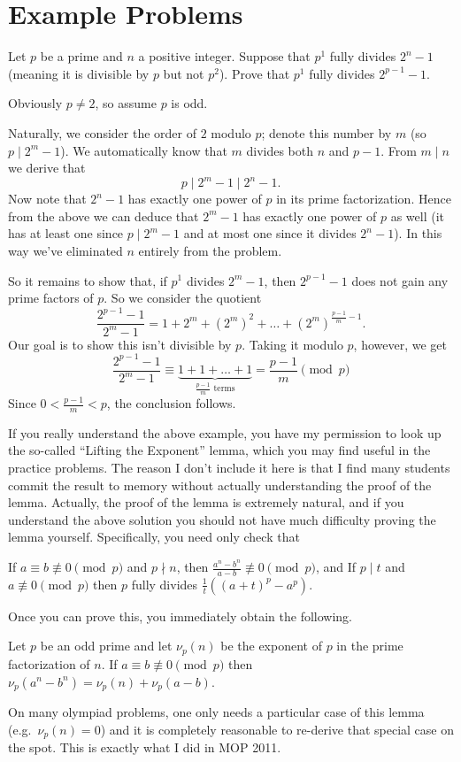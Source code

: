 \documentclass[11pt]{scrartcl}
\begin{document}
\section{Example Problems}
\begin{example}
  [MOP 2011]
  Let $p$ be a prime and $n$ a positive integer.
  Suppose that $p^1$ fully divides $2^n-1$ (meaning it is divisible by $p$ but not $p^2$).
  Prove that $p^1$ fully divides $2^{p-1}-1$.
\end{example}
\begin{soln}
  Obviously $p \neq 2$, so assume $p$ is odd.

  Naturally, we consider the order of $2$ modulo $p$; denote this number by $m$ (so $p \mid 2^m-1$).
  We automatically know that $m$ divides both $n$ and $p-1$.
  From $m \mid n$ we derive that
  \[ p \mid 2^m-1 \mid 2^n-1. \]
  Now note that $2^n-1$ has exactly one power of $p$ in its prime factorization.
  Hence from the above we can deduce that $2^m-1$ has exactly one power of $p$ as well
  (it has at least one since $p \mid 2^m-1$ and at most one since it divides $2^n-1$).
  In this way we've eliminated $n$ entirely from the problem.

  So it remains to show that, if $p^1$ divides $2^m-1$, then
  $2^{p-1}-1$ does not gain any prime factors of $p$.
  So we consider the quotient
  \[
    \frac{2^{p-1}-1}{2^m-1}
    = 1 + 2^m + \left( 2^m \right)^2 + \dots + \left( 2^m \right)^{\frac{p-1}{m}-1}.
  \]
  Our goal is to show this isn't divisible by $p$.
  Taking it modulo $p$, however, we get
  \[
    \frac{2^{p-1}-1}{2^m-1}
    \equiv \underbrace{1 + 1 + \dots + 1}_{\frac{p-1}{m} \text{ terms}} = \frac{p-1}{m} \pmod p
  \]
  Since $0 < \frac{p-1}{m} < p$, the conclusion follows.
\end{soln}
If you really understand the above example, you have my permission to look up the so-called
``Lifting the Exponent'' lemma, which you may find useful in the practice problems.
The reason I don't include it here is that I find many students commit the result to memory
without actually understanding the proof of the lemma.
Actually, the proof of the lemma is extremely natural, and if you understand the above solution
you should not have much difficulty proving the lemma yourself.
Specifically, you need only check that
\begin{itemize}
  \ii If $a \equiv b \not\equiv 0 \pmod p$ and $p \nmid n$,
  then $\frac{a^n-b^n}{a-b} \not\equiv 0 \pmod p$, and
  \ii If $p \mid t$ and $a \not\equiv 0 \pmod p$
  then $p$ fully divides $\frac 1t \left( (a+t)^p-a^p \right)$.
\end{itemize}
Once you can prove this, you immediately obtain the following.
\begin{lemma}
  Let $p$ be an odd prime and let $\nu_p(n)$
  be the exponent of $p$ in the prime factorization of $n$.
  If $a \equiv b \not\equiv 0 \pmod p$ then
  $\nu_p(a^n-b^n) = \nu_p(n) + \nu_p(a-b)$.
\end{lemma}
On many olympiad problems,
one only needs a particular case of this lemma (e.g.\ $\nu_p(n) = 0$)
and it is completely reasonable to re-derive that special case on the spot.
This is exactly what I did in MOP 2011.
\end{document}
